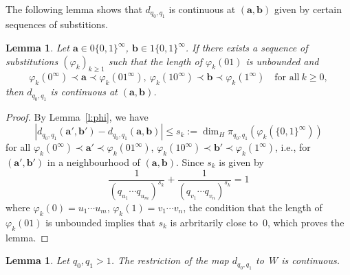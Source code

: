 \documentclass{amsart}
\newtheorem{lemma}[theorem]{Lemma}
\theoremstyle{definition}
\numberwithin{equation}{section}
\newcommand{\ba}{\mathbf{a}}
\newcommand{\bb}{\mathbf{b}}
\begin{document}
The following lemma shows that $d_{q_0,q_1}$ is continuous at $(\ba,\bb)$ given by certain sequences of substitions. 

\begin{lemma} \label{l:phik}
Let $\ba \in 0\{0,1\}^\infty$, $\bb \in 1\{0,1\}^\infty$. 
If there exists a sequence of substitutions $(\varphi_k)_{k\ge1}$ such that the length of  $\varphi_k(01)$ is unbounded and
\begin{equation*} \label{e:phii}
\varphi_k(0^\infty) \prec \ba \prec \varphi_k(01^\infty),\ \varphi_k(10^\infty) \prec \bb \prec \varphi_k(1^\infty) \quad \mbox{for all}\ k \ge 0,
\end{equation*}
then $d_{q_0,q_1}$ is continuous at $(\ba,\bb)$.
\end{lemma}

\begin{proof}
By Lemma~\ref{l:phi}, we have 
\[
|d_{q_0,q_1}(\ba',\bb') - d_{q_0,q_1}(\ba,\bb)| \le s_k := \dim_H \pi_{q_0,q_1}(\varphi_k(\{0,1\}^\infty))
\]
for all $\varphi_k(0^\infty) \prec \ba' \prec \varphi_k(01^\infty)$, $\varphi_k(10^\infty) \prec \bb' \prec \varphi_k(1^\infty)$, i.e., for $(\ba',\bb')$ in a neighbourhood of $(\ba,\bb)$. 
Since $s_k$ is given by
\[
\frac{1}{(q_{u_1}\cdots q_{u_m})^{s_k}} + \frac{1}{(q_{v_1}\cdots q_{v_n})^{s_k}} = 1
\] 
where $\varphi_k(0) = u_1\cdots u_m$, $\varphi_k(1) = v_1\cdots v_n$, the condition that the length of  $\varphi_k(01)$ is unbounded implies that $s_k$ is arbritarily close to~$0$, which proves the lemma.
\end{proof}


\begin{lemma} \label{l:sclose}
Let $q_0, q_1 > 1$.
The restriction of the map $d_{q_0,q_1}$ to~$W$ is continuous.
\end{lemma}
\end{document}
